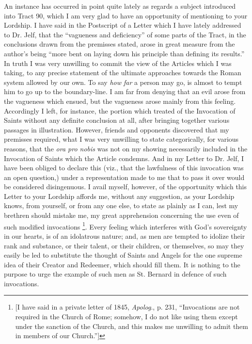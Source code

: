 An instance has occurred in point quite lately as
regards a subject introduced into Tract 90, which I am very glad to
have an opportunity of mentioning to your Lordship. I have said in the
Postscript of a Letter which I have lately addressed to Dr. Jelf, that
the ``vagueness and deficiency'' of some parts of the Tract, in the
conclusions drawn from the premisses stated, arose in great measure
from the author's being ``more bent on laying down his principle
than defining its results.'' In truth I was very unwilling to commit
the view of the Articles which I was taking, to any precise statement
of the ultimate approaches towards the Roman system allowed by our
own. To say \emph{how far} a person may go, is almost to tempt him to
go up to the boundary-line. I am far from denying that an evil arose
from the vagueness which ensued, but the vagueness arose mainly from
this feeling. Accordingly I left, for instance, the portion which
treated of the Invocation of Saints without any definite conclusion at
all, after bringing together various passages in illustration.
However, friends and opponents discovered that my premisses required,
what I was very unwilling to state categorically, for various reasons,
that the \emph{ora pro nobis} was not on my showing necessarily
included in the Invocation of Saints which the Article condemns. And
in my Letter to Dr. Jelf, I have been obliged to declare this (viz.,
that the lawfulness of this invocation was an open question,) under a
representation made to me that to pass it over would be considered
disingenuous. I avail myself, however, of the opportunity which this
Letter to your Lordship affords me, without any suggestion, as your
Lordship knows, from yourself, or from any one else, to state as
plainly as I can, lest my brethren should mistake me, my great
apprehension concerning the use even of such modified invocations \footnote{[I have said in a private letter of 1845, \emph{Apolog}., p. 231, ``Invocations
are not required in the Church of Rome; somehow, I do not like using
them except under the sanction of the Church, and this makes me
unwilling to admit them in members of our Church.'']}. Every feeling which interferes with God's sovereignty in our
hearts, is of an idolatrous nature; and, as men are tempted to idolize
their rank and substance, or their talent, or their children, or
themselves, so may they easily be led to substitute the thought of
Saints and Angels for the one supreme idea of their Creator and
Redeemer, which should fill them. It is nothing to the purpose to urge
the example of such men as St. Bernard in defence of such invocations.
